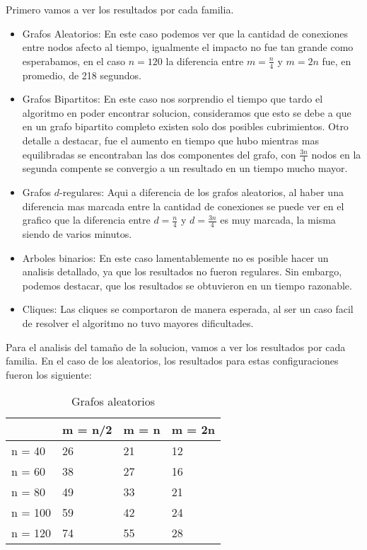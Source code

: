 \newpage
Primero vamos a ver los resultados por cada familia.

\begin{itemize}
	\item Grafos Aleatorios: En este caso podemos ver que la cantidad de conexiones entre nodos afecto al tiempo, igualmente el impacto no fue tan grande como esperabamos, en el caso $n = 120$ la diferencia entre $m = \frac{n}{4}$ y $m = 2n$ fue, en promedio, de 218 segundos.
	\item Grafos Bipartitos: En este caso nos sorprendio el tiempo que tardo el algoritmo en poder encontrar solucion, consideramos que esto se debe a que en un grafo bipartito completo existen solo dos posibles cubrimientos. Otro detalle a destacar, fue el aumento en tiempo que hubo mientras mas equilibradas se encontraban las dos componentes del grafo, con $\frac{3n}{4}$ nodos en la segunda compente se convergio a un resultado en un tiempo mucho mayor.
	\item Grafos $d$-regulares: Aqui a diferencia de los grafos aleatorios, al haber una diferencia mas marcada entre la cantidad de conexiones se puede ver en el grafico que la diferencia entre $d = \frac{n}{4}$ y $d = \frac{3n}{4}$ es muy marcada, la misma siendo de varios minutos.
	\item Arboles binarios: En este caso lamentablemente no es posible hacer un analisis detallado, ya que los resultados no fueron regulares. Sin embargo, podemos destacar, que los resultados se obtuvieron en un tiempo razonable.
	\item Cliques: Las cliques se comportaron de manera esperada, al ser un caso facil de resolver el algoritmo no tuvo mayores dificultades.
\end{itemize}

Para el analisis del tamaño de la solucion, vamos a ver los resultados por cada familia. En el caso de los aleatorios, los resultados para estas configuraciones fueron los siguiente:

\begin{table}[]
\centering
\caption{Grafos aleatorios}
\label{my-label}
\begin{tabular}{|l|lll|}
\hline
        & \multicolumn{1}{l|}{m = n/2} & \multicolumn{1}{l|}{m = n} & m = 2n \\ \hline
n = 40  & 26                           & 21                         & 12     \\ \cline{1-1}
n = 60  & 38                           & 27                         & 16     \\ \cline{1-1}
n = 80  & 49                           & 33                         & 21     \\ \cline{1-1}
n = 100 & 59                           & 42                         & 24     \\ \cline{1-1}
n = 120 & 74                           & 55                         & 28     \\ \hline
\end{tabular}
\end{table}

